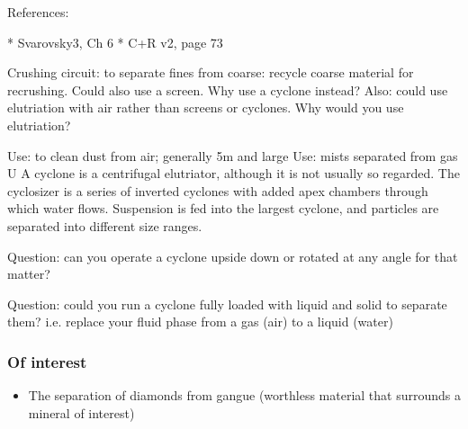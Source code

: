 References:

* Svarovsky3, Ch 6
* C+R v2, page 73


Crushing circuit: to separate fines from coarse: recycle coarse material for recrushing. Could also use a screen. Why use a cyclone instead?
Also: could use elutriation with air rather than screens or cyclones. Why would you use elutriation?

Use: to clean dust from air; generally 5\mu m and large
Use: mists separated from gas
U
A cyclone is a centrifugal elutriator, although it is not usually so regarded. The cyclosizer is a series of inverted cyclones with added apex chambers through which water flows. Suspension is fed into the largest cyclone, and particles are separated into different size ranges.

Question: can you operate a cyclone upside down or rotated at any angle for that matter?

Question: could you run a cyclone fully loaded with liquid and solid to separate them? i.e. replace your fluid phase from a gas (air) to a liquid (water)


\begin{frame}\frametitle{Of interest}
	\begin{itemize}
		\item	The separation of diamonds from gangue (worthless material that surrounds a mineral of interest)
	\end{itemize}
\end{frame}
